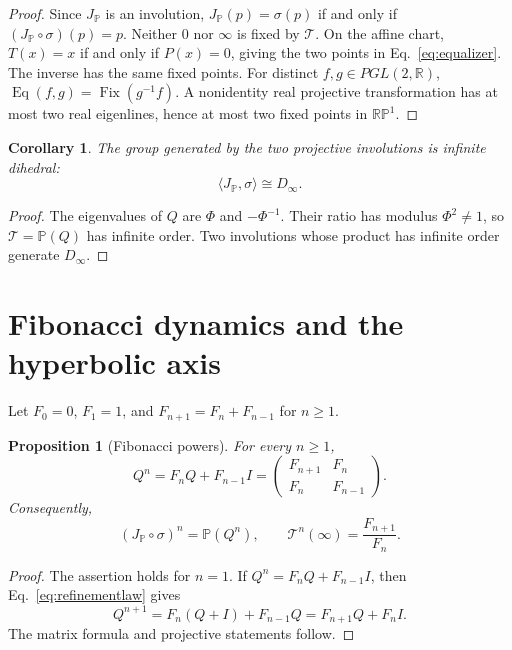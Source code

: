 \documentclass[10pt,oneside]{article}
\theoremstyle{plaincompact}
\newtheorem{proposition}[theorem]{Proposition}
\newtheorem{corollary}[theorem]{Corollary}
\theoremstyle{definitioncompact}
\newcommand{\R}{\mathbb R}
\newcommand{\RP}{\mathbb {RP}}
\newcommand{\Fib}{F}
\newcommand{\Fix}{\operatorname{Fix}}
\newcommand{\Eq}{\operatorname{Eq}}
\newcommand{\cT}{\mathcal T}
\begin{document}
\begin{proof}
Since $J_{\mathbb P}$ is an involution,
$J_{\mathbb P}(p)=\sigma(p)$ if and only if
$(J_{\mathbb P}\circ\sigma)(p)=p$.  Neither $0$ nor $\infty$ is fixed by
$\cT$.  On the affine chart, $T(x)=x$ if and only if $P(x)=0$, giving the two
points in Eq.~\eqref{eq:equalizer}.  The inverse has the same fixed points.
For distinct $f,g\in PGL(2,\R)$,
$\Eq(f,g)=\Fix(g^{-1}f)$.  A nonidentity real projective transformation has at
most two real eigenlines, hence at most two fixed points in $\RP^1$.
\end{proof}

\begin{corollary}\label{cor:dinfty}
The group generated by the two projective involutions is infinite dihedral:
\begin{equation}\label{eq:dinfty}
\langle J_{\mathbb P},\sigma\rangle\cong D_\infty.
\end{equation}
\end{corollary}

\begin{proof}
The eigenvalues of $Q$ are $\Phi$ and $-\Phi^{-1}$.  Their ratio has modulus
$\Phi^2\ne1$, so $\cT=\mathbb P(Q)$ has infinite order.  Two involutions whose
product has infinite order generate $D_\infty$.
\end{proof}

\section{Fibonacci dynamics and the hyperbolic axis}

Let $\Fib_0=0$, $\Fib_1=1$, and
$\Fib_{n+1}=\Fib_n+\Fib_{n-1}$ for $n\ge1$.

\begin{proposition}[Fibonacci powers]\label{prop:fibpowers}
For every $n\ge1$,
\begin{equation}\label{eq:fibpowers}
Q^n=\Fib_nQ+\Fib_{n-1}I
=\begin{pmatrix}
\Fib_{n+1}&\Fib_n\\
\Fib_n&\Fib_{n-1}
\end{pmatrix}.
\end{equation}
Consequently,
\begin{equation}\label{eq:projectivefib}
(J_{\mathbb P}\circ\sigma)^n=\mathbb P(Q^n),
\qquad
\cT^n(\infty)=\frac{\Fib_{n+1}}{\Fib_n}.
\end{equation}
\end{proposition}

\begin{proof}
The assertion holds for $n=1$.  If
$Q^n=\Fib_nQ+\Fib_{n-1}I$, then Eq.~\eqref{eq:refinementlaw} gives
\[
Q^{n+1}=\Fib_n(Q+I)+\Fib_{n-1}Q
=\Fib_{n+1}Q+\Fib_nI.
\]
The matrix formula and projective statements follow.
\end{proof}
\end{document}
